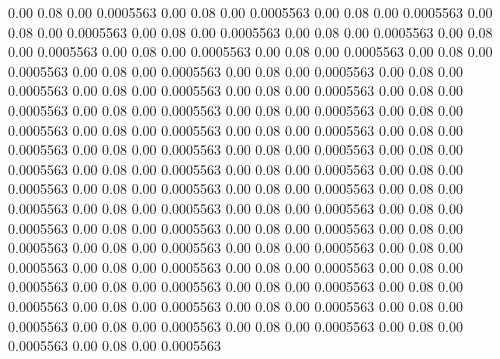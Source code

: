    0.00    0.08    0.00   0.0005563
   0.00    0.08    0.00   0.0005563
   0.00    0.08    0.00   0.0005563
   0.00    0.08    0.00   0.0005563
   0.00    0.08    0.00   0.0005563
   0.00    0.08    0.00   0.0005563
   0.00    0.08    0.00   0.0005563
   0.00    0.08    0.00   0.0005563
   0.00    0.08    0.00   0.0005563
   0.00    0.08    0.00   0.0005563
   0.00    0.08    0.00   0.0005563
   0.00    0.08    0.00   0.0005563
   0.00    0.08    0.00   0.0005563
   0.00    0.08    0.00   0.0005563
   0.00    0.08    0.00   0.0005563
   0.00    0.08    0.00   0.0005563
   0.00    0.08    0.00   0.0005563
   0.00    0.08    0.00   0.0005563
   0.00    0.08    0.00   0.0005563
   0.00    0.08    0.00   0.0005563
   0.00    0.08    0.00   0.0005563
   0.00    0.08    0.00   0.0005563
   0.00    0.08    0.00   0.0005563
   0.00    0.08    0.00   0.0005563
   0.00    0.08    0.00   0.0005563
   0.00    0.08    0.00   0.0005563
   0.00    0.08    0.00   0.0005563
   0.00    0.08    0.00   0.0005563
   0.00    0.08    0.00   0.0005563
   0.00    0.08    0.00   0.0005563
   0.00    0.08    0.00   0.0005563
   0.00    0.08    0.00   0.0005563
   0.00    0.08    0.00   0.0005563
   0.00    0.08    0.00   0.0005563
   0.00    0.08    0.00   0.0005563
   0.00    0.08    0.00   0.0005563
   0.00    0.08    0.00   0.0005563
   0.00    0.08    0.00   0.0005563
   0.00    0.08    0.00   0.0005563
   0.00    0.08    0.00   0.0005563
   0.00    0.08    0.00   0.0005563
   0.00    0.08    0.00   0.0005563
   0.00    0.08    0.00   0.0005563
   0.00    0.08    0.00   0.0005563
   0.00    0.08    0.00   0.0005563
   0.00    0.08    0.00   0.0005563
   0.00    0.08    0.00   0.0005563
   0.00    0.08    0.00   0.0005563
   0.00    0.08    0.00   0.0005563
   0.00    0.08    0.00   0.0005563
   0.00    0.08    0.00   0.0005563
   0.00    0.08    0.00   0.0005563
   0.00    0.08    0.00   0.0005563
